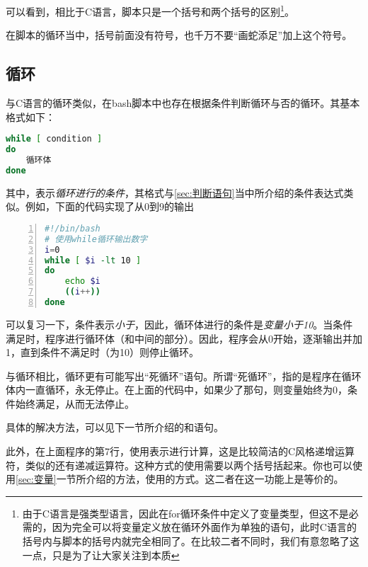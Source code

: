 可以看到，相比于C语言，脚本只是一个括号和两个括号的区别\footnote{由于C语言是强类型语言，因此在for循环条件中定义了变量类型，但这不是必需的，因为完全可以将变量定义放在循环外面作为单独的语句，此时C语言的括号内与脚本的括号内就完全相同了。在比较二者不同时，我们有意忽略了这一点，只是为了让大家关注到本质}。

\begin{attention}
    在脚本的循环当中，括号前面没有\code{\$}符号，也千万不要“画蛇添足”加上这个符号。
\end{attention}



\subsection{循环}\label{subsec:循环-while循环}

与C语言的循环类似，在bash脚本中也存在根据条件判断循环与否的循环。其基本格式如下：

\begin{lstlisting}[language=bash]
while [ condition ]
do
    循环体
done
\end{lstlisting}

其中，表示\emph{循环进行的条件}，其格式与\ref{sec:判断语句}当中所介绍的条件表达式类似。例如，下面的代码实现了从0到9的输出

\begin{lstlisting}[language=bash,numbers=left,caption={while\_example}]
#!/bin/bash
# 使用while循环输出数字
i=0
while [ $i -lt 10 ]
do
    echo $i
    ((i++))
done
\end{lstlisting}

可以复习一下，条件表示\emph{小于}，因此，循环体进行的条件是\emph{变量小于10}。当条件满足时，程序进行循环体（和中间的部分）。因此，程序会从0开始，逐渐输出并加1，直到条件不满足时（为10）则停止循环。

\begin{attention}
    与循环相比，循环更有可能写出“死循环”语句。所谓“死循环”，指的是程序在循环体内一直循环，永无停止。在上面的代码中，如果少了那句，则变量始终为0，条件始终满足，从而无法停止。

    具体的解决方法，可以见下一节所介绍的和语句。
\end{attention}

此外，在上面程序的第7行，使用表示进行计算，这是比较简洁的C风格递增运算符，类似的还有递减运算符\code{--}。这种方式的使用需要以两个括号括起来。你也可以使用\ref{sec:变量}一节所介绍的方法，使用的方式。这二者在这一功能上是等价的。


